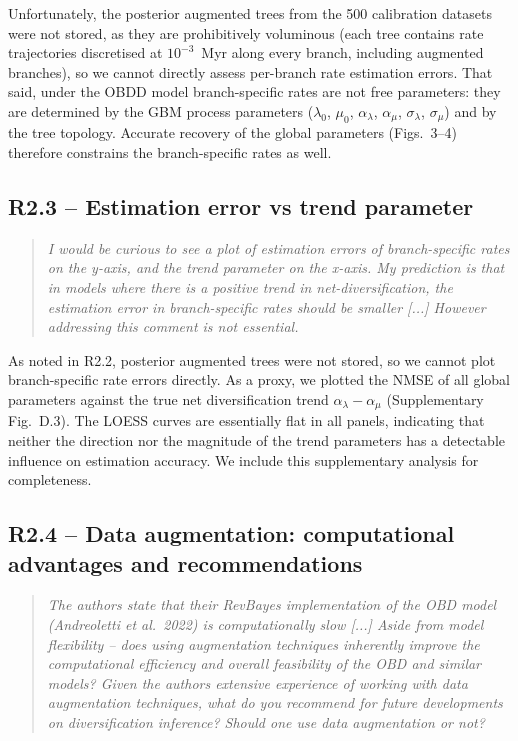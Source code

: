 \documentclass[11pt]{article}
\newenvironment{RC}{\begin{quote}\itshape}{\end{quote}}
\newcommand{\response}[1]{\noindent\textcolor{resp}{#1}\medskip}
\begin{document}
\response{Unfortunately, the posterior augmented trees from the 500 calibration datasets were not stored, as they are prohibitively voluminous (each tree contains rate trajectories discretised at $10^{-3}$~Myr along every branch, including augmented branches), so we cannot directly assess per-branch rate estimation errors. That said, under the OBDD model branch-specific rates are not free parameters: they are determined by the GBM process parameters ($\lambda_0$, $\mu_0$, $\alpha_\lambda$, $\alpha_\mu$, $\sigma_\lambda$, $\sigma_\mu$) and by the tree topology. Accurate recovery of the global parameters (Figs.~3--4) therefore constrains the branch-specific rates as well.}

\subsection*{R2.3 -- Estimation error vs trend parameter}

\begin{RC}
I would be curious to see a plot of estimation errors of branch-specific rates on the y-axis, and the trend parameter on the x-axis. My prediction is that in models where there is a positive trend in net-diversification, the estimation error in branch-specific rates should be smaller [...] However addressing this comment is not essential.
\end{RC}

\response{As noted in R2.2, posterior augmented trees were not stored, so we cannot plot branch-specific rate errors directly. As a proxy, we plotted the NMSE of all global parameters against the true net diversification trend $\alpha_\lambda - \alpha_\mu$ (Supplementary Fig.~D.3). The LOESS curves are essentially flat in all panels, indicating that neither the direction nor the magnitude of the trend parameters has a detectable influence on estimation accuracy. We include this supplementary analysis for completeness.}

\subsection*{R2.4 -- Data augmentation: computational advantages and recommendations}

\begin{RC}
The authors state that their RevBayes implementation of the OBD model (Andreoletti et al.\ 2022) is computationally slow [...] Aside from model flexibility -- does using augmentation techniques inherently improve the computational efficiency and overall feasibility of the OBD and similar models? Given the authors extensive experience of working with data augmentation techniques, what do you recommend for future developments on diversification inference? Should one use data augmentation or not?
\end{RC}
\end{document}
